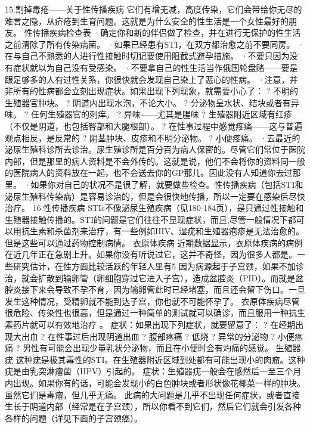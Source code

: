 \documentclass[12pt,UTF8,openany]{ctexbook}
\begin{document}
15.割掉毒疮——关于性传播疾病
它们有增无减，高度传染，它们会带给你无尽的难言之隐，从疥疮到生育问题。这就是为什么安全的性生活是一个女性最好的朋友。
性传播疾病检查表
·确定你和新的伴侣做了检查，并在进行无保护的性生活之前清除了所有传染病菌。
·如果已经患有STI，在双方都治愈之前不要同房。
·在与自己不熟悉的人进行性接触时切记要使用阻截式避孕措施。
·不要只因为没有症状就以为自己没有受感染。
·不要拿自己的性生活当作俄国轮盘赌——要是跟足够多的人有过性关系，你很快就会发现自己染上了恶心的性病。
·注意，并非所有的性病都会立刻出现症状。如果出现下列现象，就需要小心了：
? 不明的生殖器官肿块。
? 阴道内出现水泡，不论大小。
? 分泌物呈水状、结块或者有异味。
? 任何生殖器官的刺痒。
? 异味——尤其是腥味
? 生殖器附近区域有红疹（不仅是阴道，也包括臀部和大腿根部）。
? 在性事过程中感觉疼痛——这与普遍观点相反，是反常的
? 阴茎肿块、皮疹和不明分泌物。
? 小便疼痛。
·去最近的泌尿生殖科诊所去诊治。尿生殖诊所是百分百为病人保密的。尽管它们常位于医院内部，但是那里的病人资料是不会外传的。这就是说，他们不会将你的资料同一般的医院病人的资料放在一起，也不会送去你的GP那儿。因此没有人知道你去过那里。
·如果你对自己的状况不是很了解，就要做些检查。性传播疾病（包括STI和泌尿生殖科传染病）是容易诊治的，但是会很快地传播，所以一定要在感染后尽快治疗。
16.性传播疾病
STIs不像泌尿生殖疾病（见180-184页），是只通过性接触和生殖器接触传播的。STI的问题是它们往往不显现症状，而且,尽管一般情况下都可以用抗生素和杀菌剂来治疗，有一些例如HIV、湿疣和生殖器疱疹是无法治愈的。但是这些可以通过药物控制病情。
衣原体疾病
近期数据显示，衣原体疾病的病例在近几年正在急剧上升。如果你没有听说过它，这并不奇怪，因为很多人都是。一些研究估计，在性方面比较活跃的年轻人里有5%
因为病源起于子宫颈，如果不加诊治，就会扩散到输卵管（卵细胞穿过它进入子宫），造成盆腔炎（PID）。而就是盆腔炎接下来会导致不孕不育，因为输卵管此时已经堵塞，而且还会留下伤口。一旦发生这种情况，受精卵就不能到达子宫，你也就不可能怀孕了。
衣原体疾病尽管很危险、传染性也很高，但是通过一种简单的测试就可以确诊，而且服用一种抗生素药片就可以有效地治疗 。
症状：如果出现下列症状，就要留意了：
? 在经期出现大出血
? 在性事过后出现阴道出血
? 腹部疼痛
? 低烧
? 异常的分泌物
? 小便疼痛
? 男性有可能会出现少量乳状分泌物，而且在小便时会有灼痛的感觉。
生殖器疣
这种疣是极其毒性的STI。在生殖器附近区域到处都有可能出现小的肉瘤。这种疣是由乳突淋瘤菌（HPV）引起的。
症状：生殖器疣一般会在感然后一至三个月内出现。如果你有的话，可能会发现小的白色肿块或者形状像花椰菜一样的肿块。虽然它们是毒瘤，但几乎无痛。
此病的大问题是几乎不出现任何症状，或者直接生长于阴道内部（经常是在子宫颈），所以你看不到它们，然后它们就会引发各种各样的问题（详见下面的子宫颈癌）。
\end{document}
